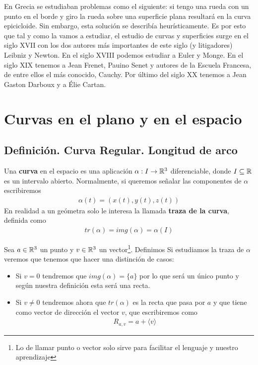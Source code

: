 
En Grecia se estudiaban problemas como el siguiente: si tengo una rueda con un punto en el borde y giro la rueda sobre una superficie plana resultará en la curva epicicloide. Sin embargo, esta solución se describía heurísticamente. Es por esto que tal y como la vamos a estudiar, el estudio de curvas y superficies surge en el siglo XVII con los dos autores más importantes de este siglo (y litigadores) Leibniz y Newton. En el siglo XVIII podemos estudiar a Euler y Monge. En el siglo XIX tenemos a Jean Frenet, Pauino Senet y autores de la Escuela Francesa, de entre ellos el más conocido, Cauchy. Por último del siglo XX tenemos a Jean Gaston Darboux y a Élie Cartan.

\chapter{Curvas en el plano y en el espacio}

\section{Definición. Curva Regular. Longitud de arco}

\begin{definicion}[Curva]
    Una \textbf{curva} en el espacio es una aplicación $\alpha: I \to \mathbb{R}^3$ diferenciable, donde $I\subseteq\mathbb{R}$ es un intervalo abierto. Normalmente, si queremos señalar las componentes de $\alpha$ escribiremos
    \begin{gather*}
        \alpha(t) = (x(t), y(t), z(t))
    \end{gather*}
    En realidad a un geómetra solo le interesa la llamada \textbf{traza de la curva}, definida como
    \begin{gather*}
        tr (\alpha) = img (\alpha) = \alpha(I)
    \end{gather*}
\end{definicion}

\begin{ejemplo}
    Sea $a\in \mathbb{R}^3$ un punto y $v\in \mathbb{R}^3$ un vector\footnote{Lo de llamar punto o vector solo sirve para facilitar el lenguaje y nuestro aprendizaje}. Definimos 
    Si estudiamos la traza de $\alpha$ veremos que tenemos que hacer una distinción de casos:

    \begin{itemize}
        \item Si $v=0$ tendremos que $img(\alpha) = \{a\}$ por lo que será un único punto y según nuestra definición esta será una recta.
        \item Si $v\neq 0$ tendremos ahora que $tr(\alpha)$ es la recta que pasa por $a$ y que tiene como vector de dirección el vector $v$, que escribiremos como 
        \begin{gather*}
            R_{a,v} = a + \langle v \rangle
        \end{gather*}
    \end{itemize}
\end{ejemplo}

